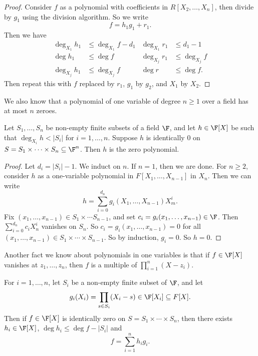 \documentclass[a4paper]{article}
\begin{document}
\begin{proof}
  Consider $f$ as a polynomial with coefficients in $R[X_2, \ldots, X_n]$, then divide by $g_1$ using the division algorithm. So we write
  \[
    f = h_1 g_1 + r_1.
  \]
  Then we have
  \begin{align*}
    \deg_{X_1} h_1 &\leq \deg_{X_1} f - d_1 & \deg_{X_1} r_1 &\leq d_1 - 1\\
    \deg h_1 &\leq \deg f & \deg_{X_j} r_1 &\leq \deg_{X_j} f\\
    \deg_{X_j} h_1 &\leq \deg_{X_j}f & \deg r &\leq \deg f.
  \end{align*}
  Then repeat this with $f$ replaced by $r_1$, $g_1$ by $g_2$, and $X_1$ by $X_2$.
\end{proof}

We also know that a polynomial of one variable of degree $n \geq 1$ over a field has at most $n$ zeroes.

\begin{lemma}
  Let $S_1, \ldots, S_n$ be non-empty finite subsets of a field $\F$, and let $h \in \F[X]$ be such that $\deg_{X_i} h < |S_i|$ for $i = 1, \ldots, n$. Suppose $h$ is identically $0$ on $S = S_1 \times \cdots \times S_n \subseteq \F^n$. Then $h$ is the zero polynomial.
\end{lemma}

\begin{proof}
  Let $d_i = |S_i| - 1$. We induct on $n$. If $n = 1$, then we are done. For $n \geq 2$, consider $h$ as a one-variable polynomial in $F[X_1, \ldots, X_{n - 1}]$ in $X_n$. Then we can write
  \[
    h = \sum_{i = 0}^{d_n} g_i(X_1, \ldots, X_{n - 1}) X_m^i.
  \]
  Fix $(x_1, \ldots, x_{n - 1}) \in S_1 \times \cdots S_{n - 1}$, and set $c_i = g_i(x_1, \ldots, x_{n - 1}) \in \F$. Then $\sum_{i = 0}^{d_n} c_i X_n^i$ vanishes on $S_n$. So $c_i = g_i(x_1, \ldots, x_{n - 1}) = 0$ for all $(x_1, \ldots, x_{n - 1}) \in S_1 \times \cdots \times S_{n - 1}$. So by induction, $g_i = 0$. So $h = 0$.
\end{proof}

Another fact we know about polynomials in one variables is that if $f \in \F[X]$ vanishes at $z_1, \ldots, z_n$, then $f$ is a multiple of $\prod_{i = 1}^n (X - z_i)$.
\begin{lemma}
  For $i = 1, \ldots, n$, let $S_i$ be a non-empty finite subset of $\F$, and let
  \[
    g_i(X_i) = \prod_{s \in S_i} (X_i - s) \in \F[X_i] \subseteq F[X].
  \]
  Then if $f \in \F[X]$ is identically zero on $S = S_1 \times \cdots \times S_n$, then there exists $h_i \in \F[X]$, $\deg h_i \leq \deg f - |S_i|$ and
  \[
    f = \sum_{i = 1}^n h_i g_i.
  \]
\end{lemma}
\end{document}

